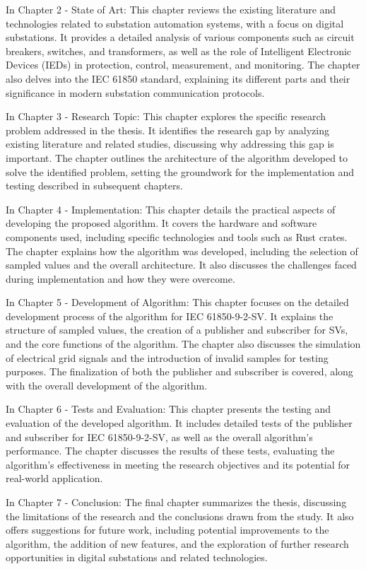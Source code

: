 In Chapter 2 - State of Art: This chapter reviews the existing literature and technologies related to substation automation systems, with a focus on digital substations. It provides a detailed analysis of various components such as circuit breakers, switches, and transformers, as well as the role of Intelligent Electronic Devices (IEDs) in protection, control, measurement, and monitoring. The chapter also delves into the IEC 61850 standard, explaining its different parts and their significance in modern substation communication protocols.

In Chapter 3 - Research Topic: This chapter explores the specific research problem addressed in the thesis. It identifies the research gap by analyzing existing literature and related studies, discussing why addressing this gap is important. The chapter outlines the architecture of the algorithm developed to solve the identified problem, setting the groundwork for the implementation and testing described in subsequent chapters.

In Chapter 4 - Implementation: This chapter details the practical aspects of developing the proposed algorithm. It covers the hardware and software components used, including specific technologies and tools such as Rust crates. The chapter explains how the algorithm was developed, including the selection of sampled values  and the overall architecture. It also discusses the challenges faced during implementation and how they were overcome.

In Chapter 5 - Development of Algorithm: This chapter focuses on the detailed development process of the algorithm for IEC 61850-9-2-SV. It explains the structure of sampled values, the creation of a publisher and subscriber for SVs, and the core functions of the algorithm. The chapter also discusses the simulation of electrical grid signals and the introduction of invalid samples for testing purposes. The finalization of both the publisher and subscriber is covered, along with the overall development of the algorithm.

In Chapter 6 - Tests and Evaluation: This chapter presents the testing and evaluation of the developed algorithm. It includes detailed tests of the publisher and subscriber for IEC 61850-9-2-SV, as well as the overall algorithm's performance. The chapter discusses the results of these tests, evaluating the algorithm's effectiveness in meeting the research objectives and its potential for real-world application.

In Chapter 7 - Conclusion: The final chapter summarizes the thesis, discussing the limitations of the research and the conclusions drawn from the study. It also offers suggestions for future work, including potential improvements to the algorithm, the addition of new features, and the exploration of further research opportunities in digital substations and related technologies.